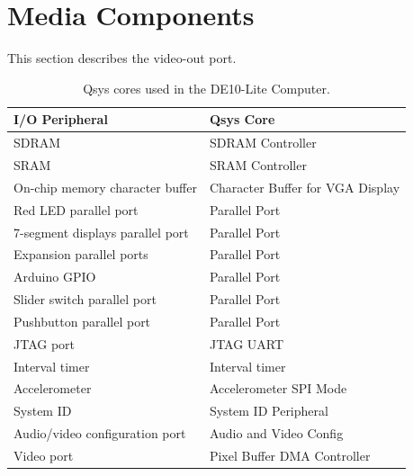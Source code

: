 \documentclass[11pt, twoside, pdftex]{article}
\newcommand{\commonFiles}{../../../common/doc}
\newcommand{\systemName}{DE10-Lite Computer}
\begin{document}








\section{Media Components}
\label{sec:multi}

This section describes the video-out port.




\begin{table}[h]
    \begin{center}
    \begin{tabular}{l|l}
            \textbf{I/O Peripheral}
            & \textbf{Qsys Core}
        \\\hline
            SDRAM
            & SDRAM Controller
        \\
            SRAM
        &   SRAM Controller
        \\
            On-chip memory character buffer
				& Character Buffer for VGA Display
        \\
            Red LED parallel port
				& Parallel Port
        \\
            7-segment displays parallel port
				& Parallel Port
        \\
            Expansion parallel ports
				& Parallel Port
        \\
						Arduino GPIO
				& Parallel Port
				\\
            Slider switch parallel port
				& Parallel Port
        \\
            Pushbutton parallel port
				& Parallel Port
        \\
            JTAG port
				& JTAG UART
        \\
            Interval timer
				& Interval timer 
				\\
						Accelerometer
			  & Accelerometer SPI Mode
				\\
						System ID
				& System ID Peripheral
        \\
            Audio/video configuration port
				& Audio and Video Config
        \\
            Video port
				& Pixel Buffer DMA Controller
        \\
    \end{tabular}
    \caption{Qsys cores used in the \systemName.}
    \label{tab:sopcnames}
    \end{center}
\end{table}
\end{document}
